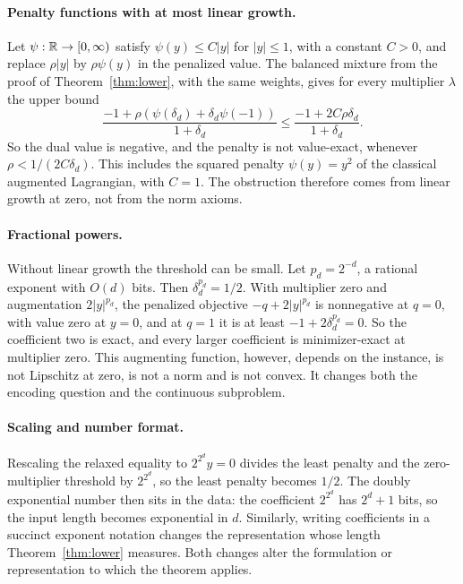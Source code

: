 \paragraph{Penalty functions with at most linear growth.}
Let $\psi:\mathbb R\to[0,\infty)$ satisfy $\psi(y)\le C|y|$ for $|y|\le1$, with
a constant $C>0$, and replace $\rho|y|$ by $\rho\psi(y)$ in the penalized
value. The balanced mixture from the proof of Theorem~\ref{thm:lower}, with
the same weights, gives for every multiplier $\lambda$ the upper bound
\[
 \frac{-1+\rho(\psi(\delta_d)+\delta_d\psi(-1))}{1+\delta_d}
 \le\frac{-1+2C\rho\delta_d}{1+\delta_d}.
\]
So the dual value is negative, and the penalty is not value-exact, whenever
$\rho<1/(2C\delta_d)$. This includes the squared penalty
$\psi(y)=y^2$ of the classical augmented Lagrangian, with $C=1$. The obstruction therefore comes from linear growth
at zero, not from the norm axioms.

\paragraph{Fractional powers.}
Without linear growth the threshold can be small. Let $p_d=2^{-d}$, a
rational exponent with $O(d)$ bits. Then $\delta_d^{p_d}=1/2$. With
multiplier zero and augmentation $2|y|^{p_d}$, the penalized objective
$-q+2|y|^{p_d}$ is nonnegative at $q=0$, with value zero at $y=0$, and at
$q=1$ it is at least $-1+2\delta_d^{p_d}=0$. So the coefficient two is
exact, and every larger coefficient is minimizer-exact at multiplier zero.
This augmenting function, however, depends on the instance, is not
Lipschitz at zero, is not a norm and is not convex. It changes both the
encoding question and the continuous subproblem.

\paragraph{Scaling and number format.}
Rescaling the relaxed equality to $2^{2^d}y=0$ divides the least penalty
and the zero-multiplier threshold by $2^{2^d}$, so the least penalty
becomes $1/2$. The doubly exponential
number then sits in the data: the coefficient $2^{2^d}$ has $2^d+1$ bits,
so the input length becomes exponential in $d$. Similarly, writing
coefficients in a succinct exponent notation changes the representation
whose length Theorem~\ref{thm:lower} measures. Both changes alter the
formulation or representation to which the theorem applies.
